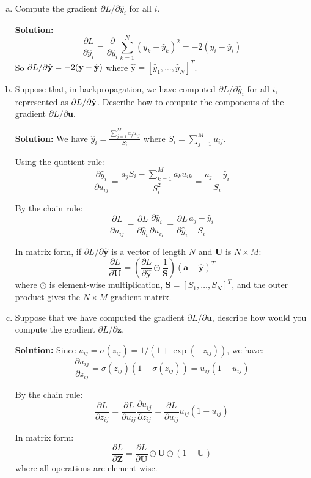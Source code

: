 \documentclass[11pt]{article}
\newcommand{\abf}{\mathbf{a}}
\newcommand{\ubf}{\mathbf{u}}
\newcommand{\ybf}{\mathbf{y}}
\newcommand{\zbf}{\mathbf{z}}
\newcommand{\Sbf}{\mathbf{S}}
\newcommand{\Ubf}{\mathbf{U}}
\newcommand{\Zbf}{\mathbf{Z}}
\begin{document}
\begin{enumerate}
\begin{enumerate}[(a)]
\item Compute the gradient  $\partial L/\partial \hat{y}_i$
for all $i$.

\textbf{Solution:}
\[
\frac{\partial L}{\partial \hat{y}_i} = \frac{\partial}{\partial \hat{y}_i} \sum_{k=1}^N (y_k - \hat{y}_k)^2 = -2(y_i - \hat{y}_i)
\]
So $\partial L/\partial \hat{\bf y} = -2(\ybf - \hat{\ybf})$ where $\hat{\ybf} = [\hat{y}_1, \ldots, \hat{y}_N]^T$.

\item Suppose that, in backpropagation, we have computed $\partial L/\partial \hat{y}_i$
for all $i$, represented as $\partial L/\partial \hat{\bf y}$. Describe how to compute the components of the gradient
$\partial L/\partial \ubf$.

\textbf{Solution:}
We have $\hat{y}_i = \frac{\sum_{j=1}^M a_j u_{ij}}{S_i}$ where $S_i = \sum_{j=1}^M u_{ij}$.

Using the quotient rule:
\[
\frac{\partial \hat{y}_i}{\partial u_{ij}} = \frac{a_j S_i - \sum_{k=1}^M a_k u_{ik}}{S_i^2} = \frac{a_j - \hat{y}_i}{S_i}
\]

By the chain rule:
\[
\frac{\partial L}{\partial u_{ij}} = \frac{\partial L}{\partial \hat{y}_i} \frac{\partial \hat{y}_i}{\partial u_{ij}} = \frac{\partial L}{\partial \hat{y}_i} \frac{a_j - \hat{y}_i}{S_i}
\]

In matrix form, if $\partial L/\partial \hat{\ybf}$ is a vector of length $N$ and $\Ubf$ is $N \times M$:
\[
\frac{\partial L}{\partial \Ubf} = \left(\frac{\partial L}{\partial \hat{\ybf}} \odot \frac{1}{\Sbf}\right) (\abf - \hat{\ybf})^T
\]
where $\odot$ is element-wise multiplication, $\Sbf = [S_1, \ldots, S_N]^T$, and the outer product gives the $N \times M$ gradient matrix.

\item
Suppose that we have computed the gradient $\partial L/\partial \ubf$, describe how would you compute the gradient $\partial L/\partial \zbf$.

\textbf{Solution:}
Since $u_{ij} = \sigma(z_{ij}) = 1/(1+\exp(-z_{ij}))$, we have:
\[
\frac{\partial u_{ij}}{\partial z_{ij}} = \sigma(z_{ij})(1 - \sigma(z_{ij})) = u_{ij}(1 - u_{ij})
\]

By the chain rule:
\[
\frac{\partial L}{\partial z_{ij}} = \frac{\partial L}{\partial u_{ij}} \frac{\partial u_{ij}}{\partial z_{ij}} = \frac{\partial L}{\partial u_{ij}} u_{ij}(1 - u_{ij})
\]

In matrix form:
\[
\frac{\partial L}{\partial \Zbf} = \frac{\partial L}{\partial \Ubf} \odot \Ubf \odot (1 - \Ubf)
\]
where all operations are element-wise.


\end{enumerate}
\end{enumerate}
\end{document}
